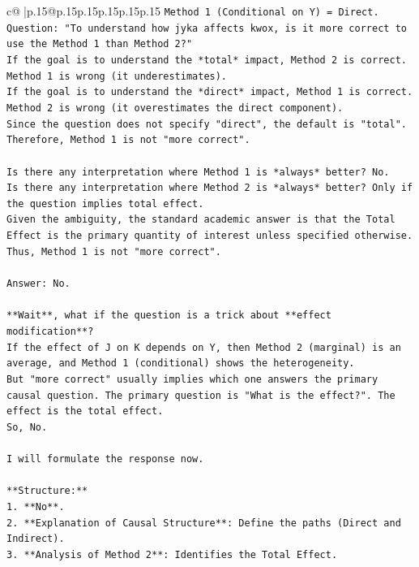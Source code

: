 \documentclass{article}
\begin{document}
{\begin{supertabular}{c@{$\;$}|p{.15\linewidth}@{}p{.15\linewidth}p{.15\linewidth}p{.15\linewidth}p{.15\linewidth}p{.15\linewidth}}
{{{\texttt{Method 1 (Conditional on Y) = Direct.} \\
\texttt{Question: "To understand how jyka affects kwox, is it more correct to use the Method 1 than Method 2?"} \\
\texttt{If the goal is to understand the *total* impact, Method 2 is correct. Method 1 is wrong (it underestimates).} \\
\texttt{If the goal is to understand the *direct* impact, Method 1 is correct. Method 2 is wrong (it overestimates the direct component).} \\
\texttt{Since the question does not specify "direct", the default is "total".} \\
\texttt{Therefore, Method 1 is not "more correct".} \\
\\ 
\texttt{Is there any interpretation where Method 1 is *always* better? No.} \\
\texttt{Is there any interpretation where Method 2 is *always* better? Only if the question implies total effect.} \\
\texttt{Given the ambiguity, the standard academic answer is that the Total Effect is the primary quantity of interest unless specified otherwise. Thus, Method 1 is not "more correct".} \\
\\ 
\texttt{Answer: No.} \\
\\ 
\texttt{**Wait**, what if the question is a trick about **effect modification**?} \\
\texttt{If the effect of J on K depends on Y, then Method 2 (marginal) is an average, and Method 1 (conditional) shows the heterogeneity.} \\
\texttt{But "more correct" usually implies which one answers the primary causal question. The primary question is "What is the effect?". The effect is the total effect.} \\
\texttt{So, No.} \\
\\ 
\texttt{I will formulate the response now.} \\
\\ 
\texttt{**Structure:**} \\
\texttt{1. **No**.} \\
\texttt{2. **Explanation of Causal Structure**: Define the paths (Direct and Indirect).} \\
\texttt{3. **Analysis of Method 2**: Identifies the Total Effect.} \\
}}}
\end{supertabular}}
\end{document}
